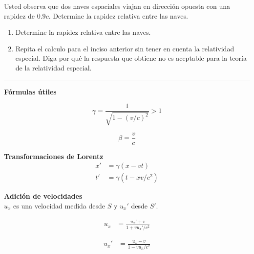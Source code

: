 \documentclass[12pt]{article}
\begin{document}
Usted observa que dos naves espaciales viajan en dirección opuesta con una rapidez de $0.9 c$. Determine la rapidez relativa entre las naves.\\

\begin{enumerate}
	\item Determine la rapidez relativa entre las naves.
	\item Repita el calculo para el inciso anterior sin tener en cuenta la relatividad especial. Diga por qué la respuesta que obtiene no es aceptable para la teoría de la relatividad especial. 
\end{enumerate}
\noindent\rule{16.5cm}{0.4pt}
\pagebreak

\textbf{Fórmulas útiles}

\begin{equation*}
\gamma = \frac{1}{\sqrt{1-(v/c)^2}} > 1
\end{equation*}
 
\begin{equation*}
\beta = \frac{v}{c}
\end{equation*}

 

\textbf{Transformaciones de Lorentz}\\



\begin{align*}
x' &= \gamma\left(x - vt\right)\\
t' &= \gamma\left(t - xv/c^2\right)
\end{align*}

\textbf{Adición de velocidades}\\
$u_x$ es una velocidad medida desde $S$ y $u_x'$ desde $S'$. 

\begin{align*}
u_x &= \frac{u_x'+v}{1+vu_x'/c^2}
\end{align*}

\begin{align*}
u_x' &= \frac{u_x- v}{1-vu_x/c^2}
\end{align*}
\end{document}
